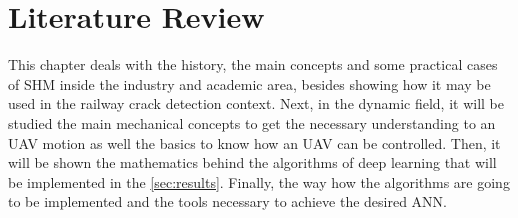 \chapter{Literature Review}\label{sec:literature_review}

This chapter deals with the history, the main concepts and some practical cases of SHM inside the industry and academic area, besides showing how it may be used in the railway crack detection context.
Next, in the dynamic field, it will be studied the main mechanical concepts to get the necessary understanding to an UAV motion as well the basics to know how an UAV can be controlled.
Then, it will be shown the mathematics behind the algorithms of deep learning that will be implemented in the \cref{sec:results}. 
Finally, the way how the algorithms are going to be implemented and the tools necessary to achieve the desired ANN.